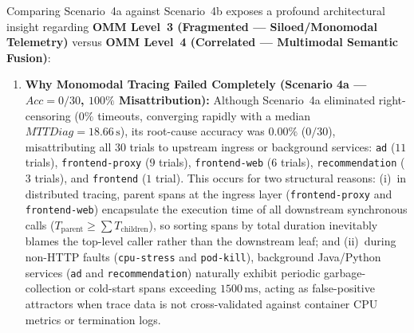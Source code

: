 Comparing Scenario~4a against Scenario~4b exposes a profound architectural insight regarding \textbf{OMM Level~3 (Fragmented --- Siloed/Monomodal Telemetry)} versus \textbf{OMM Level~4 (Correlated --- Multimodal Semantic Fusion)}:

\begin{enumerate}
    \item \textbf{Why Monomodal Tracing Failed Completely (Scenario 4a --- $Acc = 0/30$, $100\%$ Misattribution):} Although Scenario~4a eliminated right-censoring ($0\%$ timeouts, converging rapidly with a median $MTTDiag = 18.66\,\text{s}$), its root-cause accuracy was $\mathbf{0.00\%}$ ($0/30$), misattributing all $30$ trials to upstream ingress or background services: \texttt{ad} ($11$ trials), \texttt{frontend-proxy} ($9$ trials), \texttt{frontend-web} ($6$ trials), \texttt{recommendation} ($3$ trials), and \texttt{frontend} ($1$ trial). This occurs for two structural reasons: (i)~in distributed tracing, parent spans at the ingress layer (\texttt{frontend-proxy} and \texttt{frontend-web}) encapsulate the execution time of all downstream synchronous calls ($T_{\text{parent}} \ge \sum T_{\text{children}}$), so sorting spans by total duration inevitably blames the top-level caller rather than the downstream leaf; and (ii)~during non-HTTP faults (\texttt{cpu-stress} and \texttt{pod-kill}), background Java/Python services (\texttt{ad} and \texttt{recommendation}) naturally exhibit periodic garbage-collection or cold-start spans exceeding $1500\,\text{ms}$, acting as false-positive attractors when trace data is not cross-validated against container CPU metrics or termination logs.
    

\end{enumerate}
